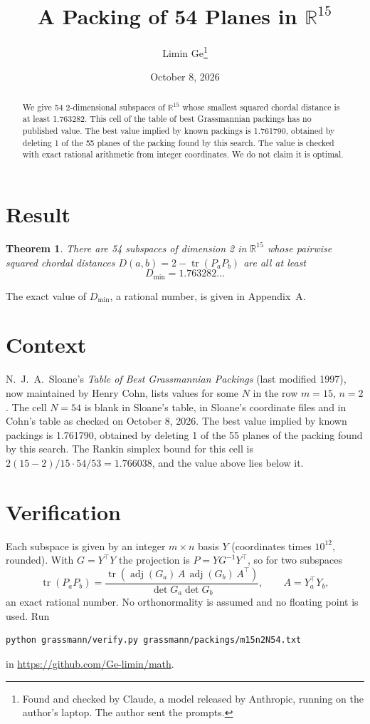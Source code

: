 \documentclass[11pt,a4paper]{article}
\title{A Packing of 54 Planes in $\mathbb{R}^{15}$}
\author{Limin Ge\thanks{Found and checked by Claude, a model released by Anthropic, running on the author's laptop. The author sent the prompts.}}
\date{October 8, 2026}
\newtheorem*{theorem}{Theorem}
\begin{document}
\maketitle
\begin{abstract}
We give 54 2-dimensional subspaces of $\mathbb{R}^{15}$ whose smallest squared chordal distance is at least 1.763282. This cell of the table of best Grassmannian packings has no published value. The best value implied by known packings is 1.761790, obtained by deleting 1 of the 55 planes of the packing found by this search. The value is checked with exact rational arithmetic from integer coordinates. We do not claim it is optimal.
\end{abstract}

\section{Result}
\begin{theorem}
There are 54 subspaces of dimension 2 in $\mathbb{R}^{15}$ whose pairwise squared chordal distances $D(a,b) = 2 - \operatorname{tr}(P_aP_b)$ are all at least
\[ D_{\min} = 1.763282\ldots \]
\end{theorem}
The exact value of $D_{\min}$, a rational number, is given in Appendix~A.


\section{Context}
N.~J.~A.~Sloane's \emph{Table of Best Grassmannian Packings} (last modified 1997), now maintained by Henry Cohn, lists values for some $N$ in the row $m=15$, $n=2$. The cell $N=54$ is blank in Sloane's table, in Sloane's coordinate files and in Cohn's table as checked on October 8, 2026. The best value implied by known packings is 1.761790, obtained by deleting 1 of the 55 planes of the packing found by this search. The Rankin simplex bound for this cell is $2(15-2)/15\cdot 54/53 = 1.766038$, and the value above lies below it.


\section{Verification}
Each subspace is given by an integer $m\times n$ basis $Y$ (coordinates times $10^{12}$, rounded). With $G=Y^\top Y$ the projection is $P=YG^{-1}Y^\top$, so for two subspaces
\[ \operatorname{tr}(P_aP_b)=\frac{\operatorname{tr}(\operatorname{adj}(G_a)\,A\,\operatorname{adj}(G_b)\,A^\top)}{\det G_a\det G_b},\qquad A=Y_a^\top Y_b, \]
an exact rational number. No orthonormality is assumed and no floating point is used. Run
\begin{verbatim}
python grassmann/verify.py grassmann/packings/m15n2N54.txt
\end{verbatim}
in \url{https://github.com/Ge-limin/math}.
\end{document}

